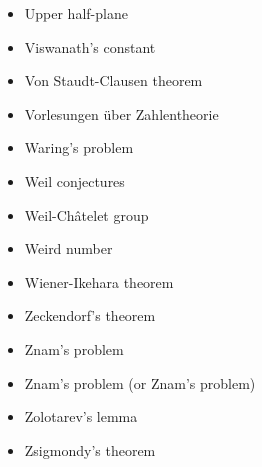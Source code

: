 \documentclass[12pt]{article}
\begin{document}
\begin{itemize}
\item Upper half-plane 
\item Viswanath's constant 
\item Von Staudt-Clausen theorem 
\item Vorlesungen \"uber Zahlentheorie 
\item Waring's problem 
\item Weil conjectures 
\item Weil-Ch\^atelet group 
\item Weird number 
\item Wiener-Ikehara theorem 
\item Zeckendorf's theorem 
\item Znam's problem 
\item Znam's problem (or Znam's problem) 
\item Zolotarev's lemma 
\item Zsigmondy's theorem 
\end{itemize}
\end{document}
